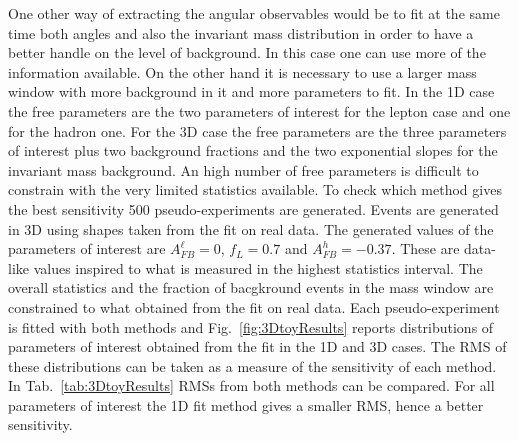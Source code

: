 One other way of extracting the angular observables would be to fit at the same time both angles 
and also the invariant mass distribution in order to have a better handle on the level of background.
In this case one can use more of the information available. On the other hand it is necessary to use 
a larger mass window with more background in it and more parameters to fit.
In the 1D case the free parameters are the two parameters of interest for the lepton case and one
for the hadron one. For the 3D case the free parameters are the three parameters of interest 
plus two background fractions and the two exponential slopes for the invariant mass background.
An high number of free parameters is difficult to constrain with the very limited statistics available.
%
To check which method gives the best sensitivity 500 pseudo-experiments are generated.
Events are generated in 3D using shapes taken from the fit on real data.
The generated values of the parameters of interest are $A_{FB}^\ell = 0$, $f_L = 0.7$ 
and $A_{FB}^h = -0.37$. These are data-like values inspired to what is measured in the highest
statistics interval. The overall statistics and the fraction of bacgkround events in the mass
window are constrained to what obtained from the fit on real data.
Each pseudo-experiment is fitted with both methods and Fig.~\ref{fig:3DtoyResults} reports 
distributions of parameters of interest obtained from the fit in the 1D and 3D cases.
The RMS of these distributions can be taken as a measure of the sensitivity of each method.
In Tab.~\ref{tab:3DtoyResults} RMSs from both methods can be compared. For all parameters 
of interest the 1D fit method gives a smaller RMS, hence a better sensitivity.

